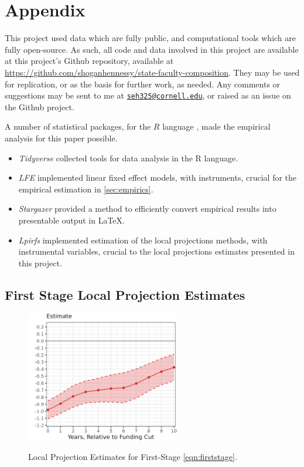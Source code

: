 \newpage
\appendix
\setcounter{table}{0}
\renewcommand{\thetable}{A\arabic{table}}
\setcounter{figure}{0}
\renewcommand{\thefigure}{A\arabic{figure}}

\section{Appendix}
\label{appendix}
This project used data which are fully public, and computational tools which are fully open-source.
As such, all code and data involved in this project are available at this project's Github repository, available at \url{https://github.com/shoganhennessy/state-faculty-composition}.
They may be used for replication, or as the basis for further work, as needed.
Any comments or suggestions may be sent to me at \href{mailto:seh325@cornell.edu}{\nolinkurl{seh325@cornell.edu}}, or raised as an issue on the Github project.

A number of statistical packages, for the $R$ language \citep{R2022}, made the empirical analysis for this paper possible.
\begin{itemize}
    \item \textit{Tidyverse} \citep{tidyverse} collected tools for data analysis in the R language.
    \item \textit{LFE} \citep{lfe} implemented linear fixed effect models, with instruments, crucial for the empirical estimation in \autoref{sec:empirics}.
    \item \textit{Stargazer} \citep{stargazer} provided a method to efficiently convert empirical results into presentable output in \LaTeX.
    \item \textit{Lpirfs} \citep{lpirfs2019} implemented estimation of the \cite{jorda2005} local projections methods, with instrumental variables, crucial to the local projections estimates presented in this project.
\end{itemize}


\subsection{First Stage Local Projection Estimates}

\begin{figure}[H]
    \centering
    \singlespacing
    \caption{Local Projection Estimates for First-Stage \autoref{eqn:firststage}.}
    \includegraphics[width=0.6\textwidth]{figures/firststage-lp.png}
    \label{fig:firststage-lp}
\end{figure}


